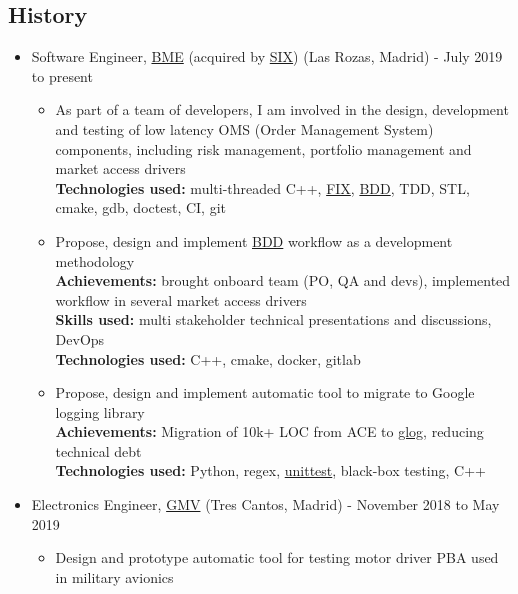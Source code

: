 \documentclass[11pt]{article}
\begin{document}
\subsection*{History}
\label{sec:org6e1a419}
\begin{itemize}
\item Software Engineer, \href{https://www.bolsasymercados.es/ing/Home}{BME} (acquired by \href{https://www.six-group.com/en/home.html}{SIX}) (Las Rozas, Madrid) - July 2019 to present\\
\begin{itemize}
\item As part of a team of developers, I am involved in the design, development and testing of low latency OMS (Order Management System) components, including risk management, portfolio management and market access drivers\\
\textbf{Technologies used:} multi-threaded C++, \href{https://www.investopedia.com/terms/f/financial-information-exchange.asp}{FIX}, \href{https://www.agilealliance.org/glossary/bdd/}{BDD}, TDD, STL, cmake, gdb, doctest, CI, git\\
\item Propose, design and implement  \href{https://www.agilealliance.org/glossary/bdd/}{BDD} workflow as a development methodology\\
\textbf{Achievements:} brought onboard team (PO, QA and devs), implemented workflow in several market access drivers\\
\textbf{Skills used:} multi stakeholder technical presentations and discussions, DevOps\\
\textbf{Technologies used:} C++, cmake, docker, gitlab\\
\item Propose, design and implement automatic tool to migrate to Google logging library\\
\textbf{Achievements:} Migration of 10k+ LOC from ACE to \href{https://github.com/google/glog}{glog}, reducing technical debt\\
\textbf{Technologies used:} Python, regex, \href{https://docs.python.org/3/library/unittest.html}{unittest}, black-box testing, C++\\
\end{itemize}
\item Electronics Engineer, \href{https://www.gmv.com/en/}{GMV} (Tres Cantos, Madrid) - November 2018 to May 2019\\
\begin{itemize}
\item Design and prototype automatic tool for testing motor driver PBA used in military avionics\\

\end{itemize}
\end{itemize}
\end{document}
